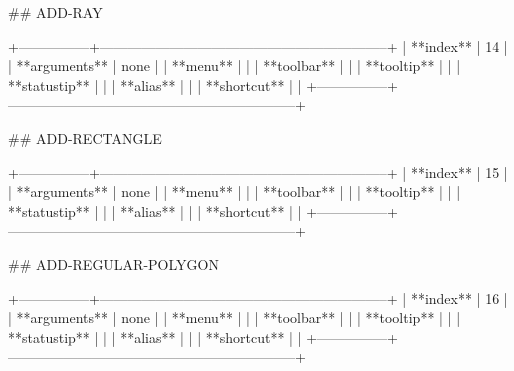 ## ADD-RAY

+---------------+--------------------------------------------------------------+
| **index**     | 14                                                           |
| **arguments** | none                                                         |
| **menu**      |                                                              |
| **toolbar**   |                                                              |
| **tooltip**   |                                                              |
| **statustip** |                                                              |
| **alias**     |                                                              |
| **shortcut**  |                                                              |
+---------------+--------------------------------------------------------------+


## ADD-RECTANGLE

+---------------+--------------------------------------------------------------+
| **index**     | 15                                                           |
| **arguments** | none                                                         |
| **menu**      |                                                              |
| **toolbar**   |                                                              |
| **tooltip**   |                                                              |
| **statustip** |                                                              |
| **alias**     |                                                              |
| **shortcut**  |                                                              |
+---------------+--------------------------------------------------------------+


## ADD-REGULAR-POLYGON

+---------------+--------------------------------------------------------------+
| **index**     | 16                                                           |
| **arguments** | none                                                         |
| **menu**      |                                                              |
| **toolbar**   |                                                              |
| **tooltip**   |                                                              |
| **statustip** |                                                              |
| **alias**     |                                                              |
| **shortcut**  |                                                              |
+---------------+--------------------------------------------------------------+


